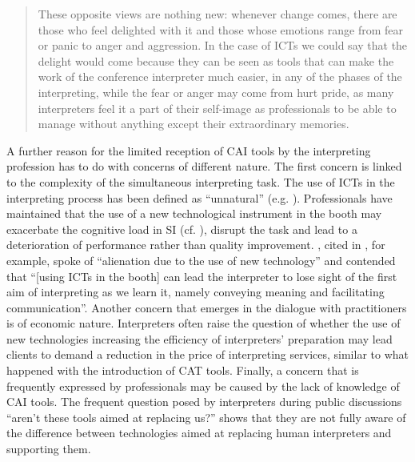\begin{quote}
    These opposite views are nothing new: whenever change comes, there are those who feel delighted with it and those whose emotions range from fear or panic to anger and aggression. In the case of ICTs we could say that the delight would come because they can be seen as tools that can make the work of the conference interpreter much easier, in any of the phases of the interpreting, while the fear or anger may come from hurt pride, as many interpreters feel it a part of their self-image as professionals to be able to manage without anything except their extraordinary memories. \citep[27]{berber2010information}
\end{quote}
A further reason for the limited reception of CAI tools by the interpreting profession has to do with concerns of different nature. The first concern is linked to the complexity of the simultaneous interpreting task. The use of ICTs in the interpreting process has been defined as ``unnatural'' (e.g. \cite{donovan2006interpreting}). Professionals have maintained that the use of a new technological instrument in the booth may exacerbate the cognitive load in SI (cf. \cite{prandi2017designing}), disrupt the task and lead to a deterioration of performance rather than quality improvement. \citet{Roderick2018}, cited in \citet{fantinuoli2018a}, for example, spoke of ``alienation due to the use of new technology'' and contended that ``[using ICTs in the booth] can lead the interpreter to lose sight of the first aim of interpreting as we learn it, namely conveying meaning and facilitating communication''. Another concern that emerges in the dialogue with practitioners is of economic nature. Interpreters often raise the question of whether the use of new technologies increasing the efficiency of interpreters’ preparation may lead clients to demand a reduction in the price of interpreting services, similar to what happened with the introduction of CAT tools. Finally, a concern that is frequently expressed by professionals may be caused by the lack of knowledge of CAI tools. The frequent question posed by interpreters during public discussions ``aren’t these tools aimed at replacing us?'' shows that they are not fully aware of the difference between technologies aimed at replacing human interpreters and supporting them.

